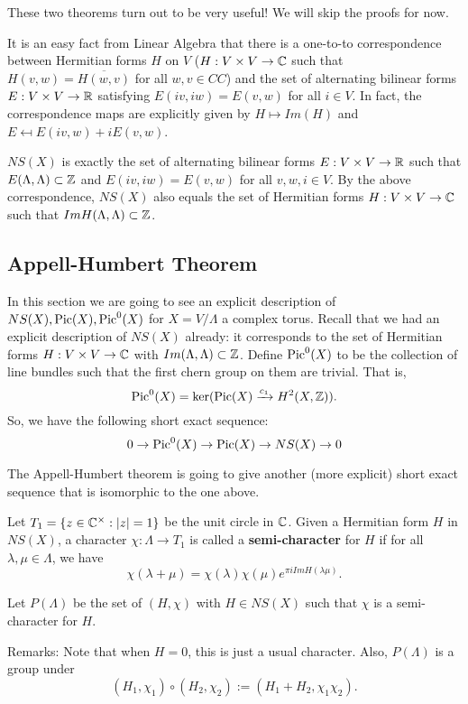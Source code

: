 These two theorems turn out to be very useful! We will skip the proofs for now. 

It is an easy fact from Linear Algebra that there is a one-to-to correspondence between Hermitian forms $H$ on $V$ ($H:V\times V\to {\mathbb C}$ such that $H(v,w)=\overline{H(w,v)}$ for all $w,v\in CC$) and the set of alternating bilinear forms $E:V\times V\to {\mathbb R}$ satisfying $E(iv,iw)=E(v,w)$ for all $i\in V$. In fact, the correspondence maps are explicitly given by 
$H\mapsto Im(H)$
and 
$E\mapsfrom E(iv,w)+iE(v,w)$. 

\begin{corollary}
$NS(X)$ is exactly the set of alternating bilinear forms $E: V\times V\to {\mathbb R}$ such that $E(\Lambda,\Lambda)\subset {\mathbb Z}$ and $E(iv,iw)=E(v,w)$ for all $v,w,i\in V$. By the above correspondence, $NS(X)$ also equals the set of Hermitian forms $H:V\times V\to {\mathbb C}$ such that $Im H(\Lambda,\Lambda)\subset {\mathbb Z}$. 
\end{corollary}


\subsection{Appell-Humbert Theorem}

In this section we are going to see an explicit description of $NS(X),\operatorname{Pic}(X),\operatorname{Pic}^0(X)$ for $X=V/\Lambda$ a complex torus. Recall that we had an explicit description of $NS(X)$ already: it corresponds to the set of Hermitian forms $H:V\times V\to {\mathbb C}$ with $Im(\Lambda,\Lambda)\subset {\mathbb Z}$. Define $\operatorname{Pic}^0(X)$ to be the collection of line bundles such that the first chern group on them are trivial. That is, 
$$\operatorname{Pic}^0(X)=\ker(\operatorname{Pic}(X) \xrightarrow{c_1} H^2(X,{\mathbb Z})).$$
So, we have the following short exact sequence:
$$0\to \operatorname{Pic}^0(X)\to \operatorname{Pic}(X)\to NS(X)\to 0$$

The Appell-Humbert theorem is going to give another (more explicit) short exact sequence that is isomorphic to the one above. 


Let $T_1=\{z\in {\mathbb C}^\times: |z|=1\}$ be the unit circle in ${\mathbb C}$. Given a Hermitian form $H$ in $NS(X)$, a character $\chi:\Lambda\to T_1$ is called a \textbf{semi-character} for $H$ if for all $\lambda,\mu\in \Lambda$, we have
$$\chi(\lambda+\mu)=\chi(\lambda)\chi(\mu)e^{\pi i Im H(\lambda\mu)}.$$

Let $P(\Lambda)$ be the set of $(H,\chi)$ with $H\in NS(X)$ such that $\chi$ is a semi-character for $H$.

Remarks: Note that when $H=0$, this is just a usual character. Also, $P(\Lambda)$ is a group under
$$(H_1,\chi_1)\circ (H_2,\chi_2):=(H_1+H_2,\chi_1\chi_2).$$

